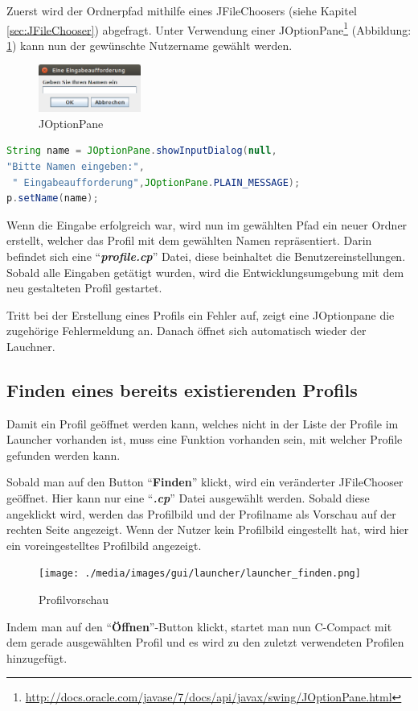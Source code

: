 Zuerst wird der Ordnerpfad mithilfe eines JFileChoosers (siehe Kapitel \ref{sec:JFileChooser}) abgefragt. Unter Verwendung einer JOptionPane\footnote{\url{http://docs.oracle.com/javase/7/docs/api/javax/swing/JOptionPane.html}}  (Abbildung: \ref{fig:JOptionPane}) kann nun der gewünschte Nutzername gewählt werden.
\begin{figure}[h] 
   \centering
     \includegraphics[width=0.3\textwidth]{./media/images/gui/launcher/JOptionPane.png}
  \caption{JOptionPane}
  \label{fig:JOptionPane}
\end{figure}

\begin{lstlisting}[language=JAVA]
String name = JOptionPane.showInputDialog(null,
"Bitte Namen eingeben:",
 " Eingabeaufforderung",JOptionPane.PLAIN_MESSAGE);
p.setName(name);
\end{lstlisting}

Wenn die Eingabe erfolgreich war, wird nun im gewählten Pfad ein neuer Ordner erstellt, welcher das Profil mit dem gewählten Namen repräsentiert. Darin befindet sich eine "`\textit{\textbf{profile.cp}}"' Datei, diese beinhaltet die Benutzereinstellungen. Sobald alle Eingaben getätigt wurden, wird die Entwicklungsumgebung mit dem neu gestalteten Profil gestartet.

Tritt bei der Erstellung eines Profils ein Fehler auf, zeigt eine JOptionpane die zugehörige Fehlermeldung an. Danach öffnet sich automatisch wieder der Lauchner. 

\subsection{Finden eines bereits existierenden Profils}
Damit ein Profil geöffnet werden kann, welches nicht in der Liste der Profile im Launcher vorhanden ist, muss eine Funktion vorhanden sein, mit welcher Profile gefunden werden kann.

Sobald man auf den Button "`\textbf{Finden}"' klickt, wird ein veränderter JFileChooser geöffnet. Hier kann nur eine "`\textit{\textbf{.cp}}"' Datei ausgewählt werden. Sobald diese angeklickt wird, werden das Profilbild und der Profilname als Vorschau auf der rechten Seite angezeigt. Wenn der Nutzer kein Profilbild eingestellt hat, wird hier ein voreingestelltes Profilbild angezeigt.

\begin{figure}[h] 
   \centering
     \texttt{[image: ./media/images/gui/launcher/launcher\_finden.png]}
  \caption{ Profilvorschau}
  \label{fig:Bild1}
\end{figure}

Indem man auf den "`\textbf{Öffnen}"'-Button klickt, startet man nun C-Compact mit dem gerade ausgewählten Profil und es wird zu den zuletzt verwendeten Profilen hinzugefügt.
